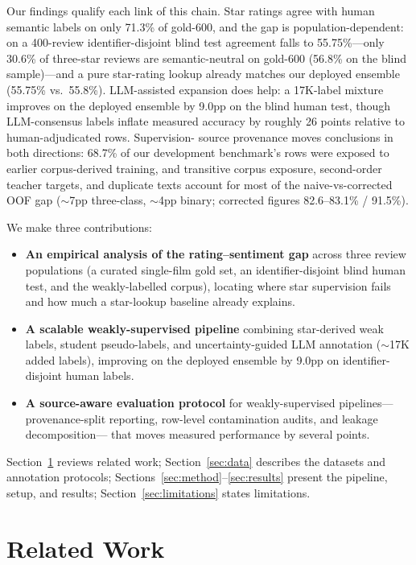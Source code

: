 Our findings qualify each link of this chain. Star ratings agree with
human semantic labels on only 71.3\% of gold-600, and the gap is
population-dependent: on a 400-review identifier-disjoint blind test
agreement falls to 55.75\%---only 30.6\% of three-star reviews are
semantic-neutral on gold-600 (56.8\% on the blind sample)---and a
pure star-rating lookup already matches our deployed ensemble
(55.75\% vs.\ 55.8\%). LLM-assisted expansion does help: a 17K-label
mixture improves on the deployed ensemble by 9.0pp on the blind human
test, though LLM-consensus labels inflate measured accuracy by
roughly 26 points relative to human-adjudicated rows. Supervision-
source provenance moves conclusions in both directions: 68.7\% of our
development benchmark's rows were exposed to earlier corpus-derived
training, and transitive corpus exposure, second-order teacher
targets, and duplicate texts account for most of the naive-vs-corrected
OOF gap ($\sim$7pp three-class, $\sim$4pp binary; corrected figures
82.6--83.1\% / 91.5\%).

We make three contributions:
\begin{itemize}
  \item \textbf{An empirical analysis of the rating--sentiment gap}
        across three review populations (a curated single-film gold
        set, an identifier-disjoint blind human test, and the
        weakly-labelled corpus), locating where star supervision fails
        and how much a star-lookup baseline already explains.
  \item \textbf{A scalable weakly-supervised pipeline} combining
        star-derived weak labels, student pseudo-labels, and
        uncertainty-guided LLM annotation ($\sim$17K added labels),
        improving on the deployed ensemble by 9.0pp on
        identifier-disjoint human labels.
  \item \textbf{A source-aware evaluation protocol} for
        weakly-supervised pipelines---provenance-split reporting,
        row-level contamination audits, and leakage decomposition---
        that moves measured performance by several points.
\end{itemize}
Section~\ref{sec:related} reviews related work;
Section~\ref{sec:data} describes the datasets and annotation protocols;
Sections~\ref{sec:method}--\ref{sec:results} present the pipeline,
setup, and results; Section~\ref{sec:limitations} states limitations.

\section{Related Work}
\label{sec:related}

